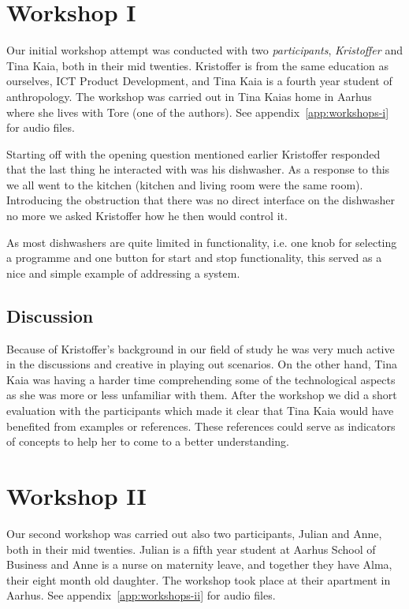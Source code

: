 \section{Workshop I}

Our initial workshop attempt was conducted with two \emph{participants}, \emph{Kristoffer} and Tina Kaia, both in their mid twenties.
Kristoffer is from the same education as ourselves, ICT Product Development, and Tina Kaia is a fourth year student of anthropology.
The workshop was carried out in Tina Kaias home in Aarhus where she lives with Tore (one of the authors).
See appendix~\ref{app:workshops-i} for  audio files.

Starting off with the opening question mentioned earlier Kristoffer responded that the last thing he interacted with was his dishwasher.
As a response to this we all went to the kitchen (kitchen and living room were the same room).
Introducing the obstruction that there was no direct interface on the dishwasher no more we asked Kristoffer how he then would control it.

As most dishwashers are quite limited in functionality, i.e. one knob for selecting a programme and one button for start and stop functionality, this served as a nice and simple example of addressing a system.

\subsection{Discussion}

Because of Kristoffer's background in our field of study he was very much active in the discussions and creative in playing out scenarios.
On the other hand, Tina Kaia was having a harder time comprehending some of the technological aspects as she was more or less unfamiliar with them.
After the workshop we did a short evaluation with the participants which made it clear that Tina Kaia would have benefited from examples or references.
These references could serve as indicators of concepts to help her to come to a better understanding.

\section{Workshop II}

Our second workshop was carried out also two participants, Julian and Anne, both in their mid twenties.
Julian is a fifth year student at Aarhus School of Business and Anne is a nurse on maternity leave, and together they have Alma, their eight month old daughter.
The workshop took place at their apartment in Aarhus.
See appendix~\ref{app:workshops-ii} for  audio files.

